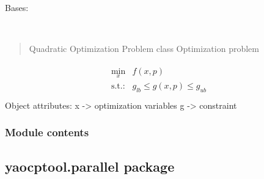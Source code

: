 \documentclass[letterpaper,10pt,english]{sphinxmanual}
\begin{document}
\begin{fulllineitems}
\label{\detokenize{yaocptool.optimization:yaocptool.optimization.quadratic_problem.QuadraticOptimizationProblem}}
Bases: {\hyperref[\detokenize{yaocptool.optimization:yaocptool.optimization.abstract_optimization_problem.AbstractOptimizationProblem}]{}}

\begin{fulllineitems}
\label{\detokenize{yaocptool.optimization:yaocptool.optimization.quadratic_problem.QuadraticOptimizationProblem.__init__}}~\begin{quote}

Quadratic Optimization Problem class
Optimization problem
\end{quote}
\begin{align*}\!\begin{aligned}
\min_x &f(x, p)\\
\textrm{s.t.:} &g_{lb} \leq g(x,p) \leq g_{ub}\\
\end{aligned}\end{align*}
Object attributes:
x -\textgreater{} optimization variables
g -\textgreater{} constraint

\end{fulllineitems}


\end{fulllineitems}



\subsubsection{Module contents}
\label{\detokenize{yaocptool.optimization:module-yaocptool.optimization}}\label{\detokenize{yaocptool.optimization:module-contents}}

\subsection{yaocptool.parallel package}
\label{\detokenize{yaocptool.parallel:yaocptool-parallel-package}}\label{\detokenize{yaocptool.parallel::doc}}
\end{document}
